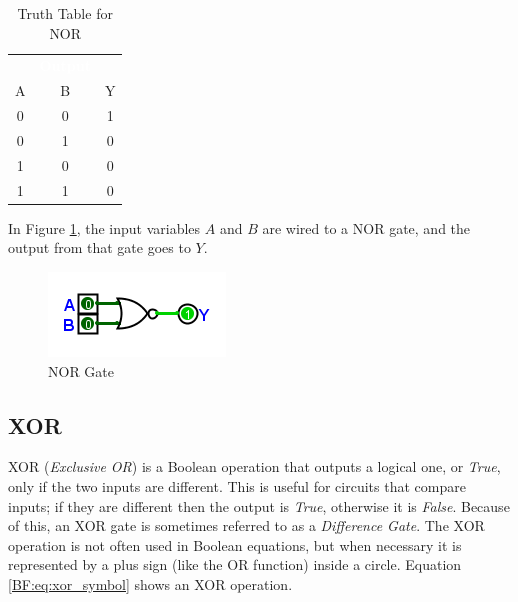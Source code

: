 \begin{table}[H]
  \sffamily
  \newcommand{\head}[1]{\textcolor{white}{\textbf{#1}}}    
  \begin{center}
    \begin{tabular}{ccc} 
      \rowcolor{black!75}
      \multicolumn{2}{c}{\head{Inputs}} & \head{Output} \\
      A & B & Y \\
      \hline
      0 & 0 & 1 \\
      0 & 1 & 0 \\
      1 & 0 & 0 \\
      1 & 1 & 0 
    \end{tabular}
  \end{center}
  \caption{Truth Table for NOR}
  \label{BF:tab:truth_table_for_nor}
\end{table}

In Figure \ref{fig:04_06}, the input variables $ A $ and $ B $ are wired to a \textsf{NOR}  gate, and the output from that gate goes to $ Y $. 

\begin{figure}[H]
	\centering
	\includegraphics[width=\maxwidth{.95\linewidth}]{gfx/04_06}
	\caption{NOR Gate}
	\label{fig:04_06}
\end{figure}


\subsection{XOR}
\label{BF:subsec:xor}

\textsf{XOR} (\emph{Exclusive OR}) is a Boolean operation that outputs a logical one, or \emph{True}, only if the two inputs are different. This is useful for circuits that compare inputs; if they are different then the output is \emph{True}, otherwise it is \emph{False}. Because of this, an \textsf{XOR}  gate is sometimes referred to as a \emph{Difference Gate}. The \textsf{XOR} operation is not often used in Boolean equations, but when necessary it is represented by a plus sign (like the OR function) inside a circle. Equation \ref{BF:eq:xor_symbol} shows an \textsf{XOR}  operation.


